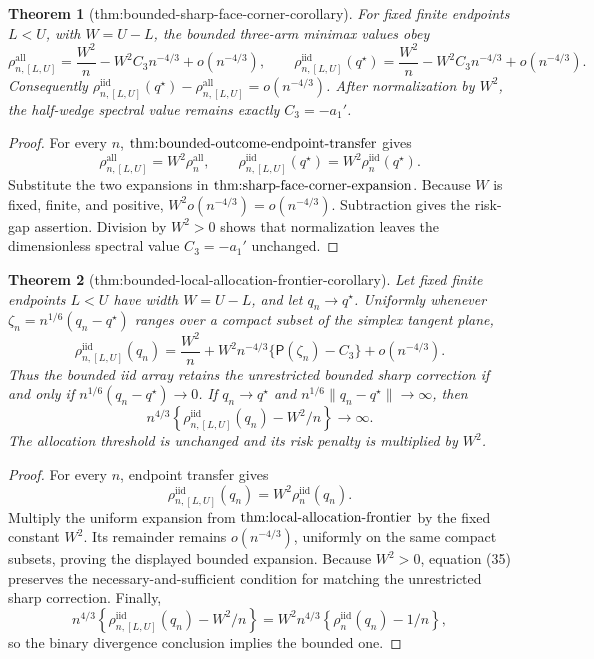 \documentclass{article}
\newtheorem{theorem}{Theorem}
\begin{document}
\begin{theorem}[thm:bounded-sharp-face-corner-corollary]\label{thm:bounded-sharp-face-corner-corollary}
For fixed finite endpoints \(L<U\), with \(W=U-L\), the bounded three-arm minimax values obey
\[
\rho_{n,[L,U]}^{\mathrm{all}}
=\frac{W^2}{n}-W^2C_3n^{-4/3}+o(n^{-4/3}),
\qquad
\rho_{n,[L,U]}^{\mathrm{iid}}(q^\star)
=\frac{W^2}{n}-W^2C_3n^{-4/3}+o(n^{-4/3}).
\]
Consequently
\(\rho_{n,[L,U]}^{\mathrm{iid}}(q^\star)-\rho_{n,[L,U]}^{\mathrm{all}}=o(n^{-4/3})\).  After normalization by \(W^2\), the half-wedge spectral value remains exactly \(C_3=-a_1'\).
\end{theorem}
\begin{proof}
For every \(n\), \(\textnormal{thm:bounded-outcome-endpoint-transfer}\) gives
\[
\rho_{n,[L,U]}^{\mathrm{all}}=W^2\rho_n^{\mathrm{all}},
\qquad
\rho_{n,[L,U]}^{\mathrm{iid}}(q^\star)=W^2\rho_n^{\mathrm{iid}}(q^\star).
\]
Substitute the two expansions in \(\textnormal{thm:sharp-face-corner-expansion}\).  Because \(W\) is fixed, finite, and positive, \(W^2o(n^{-4/3})=o(n^{-4/3})\).  Subtraction gives the risk-gap assertion.  Division by \(W^2>0\) shows that normalization leaves the dimensionless spectral value \(C_3=-a_1'\) unchanged.
\end{proof}

\begin{theorem}[thm:bounded-local-allocation-frontier-corollary]\label{thm:bounded-local-allocation-frontier-corollary}
Let fixed finite endpoints \(L<U\) have width \(W=U-L\), and let \(q_n\to q^\star\).  Uniformly whenever \(\zeta_n=n^{1/6}(q_n-q^\star)\) ranges over a compact subset of the simplex tangent plane,
\[
\rho_{n,[L,U]}^{\mathrm{iid}}(q_n)
=\frac{W^2}{n}+W^2n^{-4/3}\{\mathsf P(\zeta_n)-C_3\}
+o(n^{-4/3}).
\]
Thus the bounded iid array retains the unrestricted bounded sharp correction if and only if
\(n^{1/6}(q_n-q^\star)\to0\).  If \(q_n\to q^\star\) and
\(n^{1/6}\|q_n-q^\star\|\to\infty\), then
\[
n^{4/3}\left\{\rho_{n,[L,U]}^{\mathrm{iid}}(q_n)-W^2/n\right\}\longrightarrow\infty.
\]
The allocation threshold is unchanged and its risk penalty is multiplied by \(W^2\).
\end{theorem}
\begin{proof}
For every \(n\), endpoint transfer gives
\[
\rho_{n,[L,U]}^{\mathrm{iid}}(q_n)
=W^2\rho_n^{\mathrm{iid}}(q_n).
\tag{35}
\]
Multiply the uniform expansion from \(\textnormal{thm:local-allocation-frontier}\) by the fixed constant \(W^2\).  Its remainder remains \(o(n^{-4/3})\), uniformly on the same compact subsets, proving the displayed bounded expansion.  Because \(W^2>0\), equation (35) preserves the necessary-and-sufficient condition for matching the unrestricted sharp correction.  Finally,
\[
n^{4/3}\left\{\rho_{n,[L,U]}^{\mathrm{iid}}(q_n)-W^2/n\right\}
=W^2n^{4/3}\left\{\rho_n^{\mathrm{iid}}(q_n)-1/n\right\},
\]
so the binary divergence conclusion implies the bounded one.
\end{proof}
\end{document}
